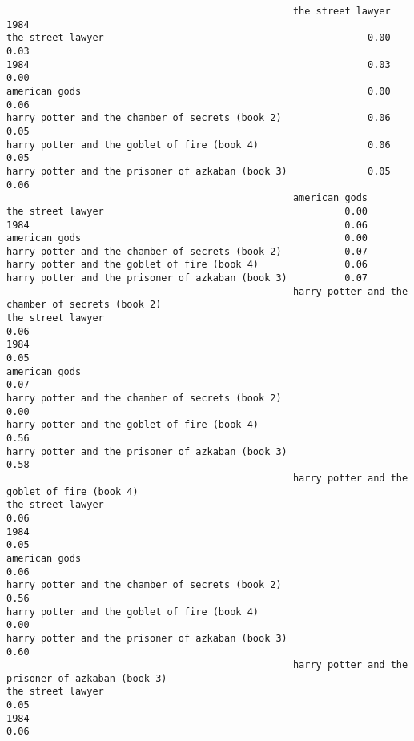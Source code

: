 \documentclass[
]{report}
\begin{document}
\begin{verbatim}
                                                  the street lawyer 1984
the street lawyer                                              0.00 0.03
1984                                                           0.03 0.00
american gods                                                  0.00 0.06
harry potter and the chamber of secrets (book 2)               0.06 0.05
harry potter and the goblet of fire (book 4)                   0.06 0.05
harry potter and the prisoner of azkaban (book 3)              0.05 0.06
                                                  american gods
the street lawyer                                          0.00
1984                                                       0.06
american gods                                              0.00
harry potter and the chamber of secrets (book 2)           0.07
harry potter and the goblet of fire (book 4)               0.06
harry potter and the prisoner of azkaban (book 3)          0.07
                                                  harry potter and the chamber of secrets (book 2)
the street lawyer                                                                             0.06
1984                                                                                          0.05
american gods                                                                                 0.07
harry potter and the chamber of secrets (book 2)                                              0.00
harry potter and the goblet of fire (book 4)                                                  0.56
harry potter and the prisoner of azkaban (book 3)                                             0.58
                                                  harry potter and the goblet of fire (book 4)
the street lawyer                                                                         0.06
1984                                                                                      0.05
american gods                                                                             0.06
harry potter and the chamber of secrets (book 2)                                          0.56
harry potter and the goblet of fire (book 4)                                              0.00
harry potter and the prisoner of azkaban (book 3)                                         0.60
                                                  harry potter and the prisoner of azkaban (book 3)
the street lawyer                                                                              0.05
1984                                                                                           0.06

\end{verbatim}
\end{document}
